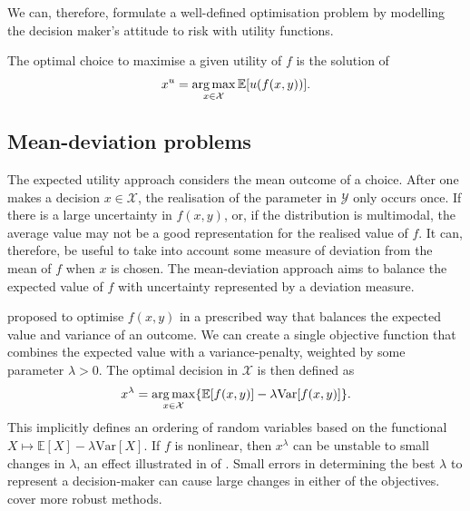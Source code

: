\documentclass[main.tex]{subfiles}
\begin{document}
We can, therefore, formulate a well-defined optimisation problem by
modelling the decision maker's attitude to risk with utility functions.

\begin{problem}
  The optimal choice to maximise a given utility of $f$ is the
  solution of
  \begin{align}
    x^u=\operatorname*{arg\,max}_{x\in\mathcal{X}} \mathbb{E}[u(f(x,y))].
  \end{align}
\end{problem}

\subsection{Mean-deviation problems}
The expected utility approach considers the mean outcome of a choice.
After one makes a decision $x\in\mathcal{X}$, the realisation of the
parameter in $\mathcal{Y}$ only occurs once. If there is a large
uncertainty in $f(x,y)$, or, if the distribution is multimodal, the
average value may not be a good representation for the realised value of $f$.
It can, therefore, be useful to take into account some measure of
deviation from the mean of $f$ when $x$ is chosen.
The mean-deviation approach aims to balance the expected value of $f$
with uncertainty represented by a deviation measure.

\begin{example}
  \citet{markowitz1952portfolio} proposed to optimise $f(x,y)$ in
  a prescribed way that
  balances the expected value and variance of an outcome.
  We can create a single objective function that combines
  the expected value with a variance-penalty, weighted by some
  parameter $\lambda>0$. The optimal decision in $\mathcal{X}$ is then
  defined as
  \begin{equation}\label{eq:mean_dev_weighted}
    x^{\lambda}=\operatorname*{arg\,max}_{x\in\mathcal{X}}\{\mathbb{E}[f(x,y)]-\lambda
    \mbox{Var}[f(x,y)]\}.
  \end{equation}
  This implicitly defines an ordering of random variables based on
  the functional $X\mapsto \mathbb{E}[X]-\lambda \mbox{Var}[X]$.
  If $f$ is nonlinear, then $x^{\lambda}$ can be unstable to
  small changes in $\lambda$, an effect illustrated in
   of .
  Small errors in determining the best
  $\lambda$ to represent a decision-maker can cause large changes in
  either of the objectives. \citet{marler2004survey} cover
  more robust methods.
\end{example}
\end{document}
